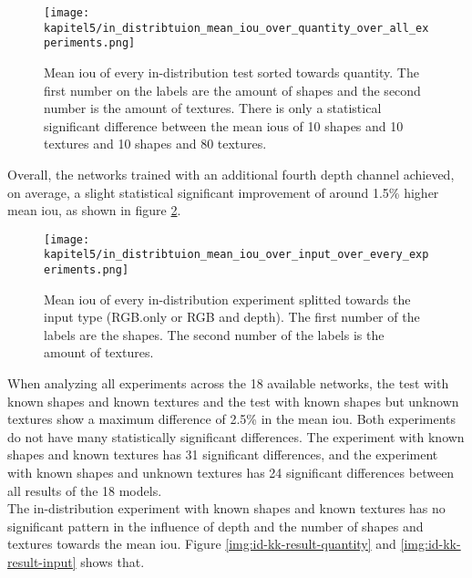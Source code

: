 			\FloatBarrier
			\begin{figure}[h]
				\centering
				\texttt{[image: kapitel5/in\_distribtuion\_mean\_iou\_over\_quantity\_over\_all\_experiments.png]}
				\caption[Mean \ac{iou} of every in-distribution test sorted towards quantity. The first number on the labels are the amount of shapes and the second number is the amount of textures. There is only a statistical significant difference between the mean \ac{iou}s of 10 shapes and 10 textures and 10 shapes and 80 textures.]{Mean \ac{iou} of every in-distribution test sorted towards quantity. The first number on the labels are the amount of shapes and the second number is the amount of textures. There is only a statistical significant difference between the mean \ac{iou}s of 10 shapes and 10 textures and 10 shapes and 80 textures.}
				\label{img:id-result-quantity}
			\end{figure}
			
			Overall, the networks trained with an additional fourth depth channel achieved, on average, a slight statistical significant improvement of around 1.5\% higher mean \ac{iou}, as shown in figure \ref{img:id-result-input}.
			
			\begin{figure}[h]
				\centering
				\texttt{[image: kapitel5/in\_distribtuion\_mean\_iou\_over\_input\_over\_every\_experiments.png]}
				\caption[Mean \ac{iou} of every in-distribution experiment splitted towards the input type (RGB.only or RGB and depth). The first number of the labels are the shapes. The second number of the labels is the amount of textures.]{Mean \ac{iou} of every in-distribution experiment splitted towards the input type (RGB.only or RGB and depth). The first number of the labels are the shapes. The second number of the labels is the amount of textures.}
				\label{img:id-result-input}
			\end{figure}
			
			\FloatBarrier
			
			When analyzing all experiments across the 18 available networks, the test with known shapes and known textures and the test with known shapes but unknown textures show a maximum difference of 2.5\% in the mean \ac{iou}. Both experiments do not have many statistically significant differences. The experiment with known shapes and known textures has 31 significant differences, and the experiment with known shapes and unknown textures has 24 significant differences between all results of the 18 models.\\
			The in-distribution experiment with known shapes and known textures has no significant pattern in the influence of depth and the number of shapes and textures towards the mean \ac{iou}. Figure \ref{img:id-kk-result-quantity} and \ref{img:id-kk-result-input} shows that.
			
